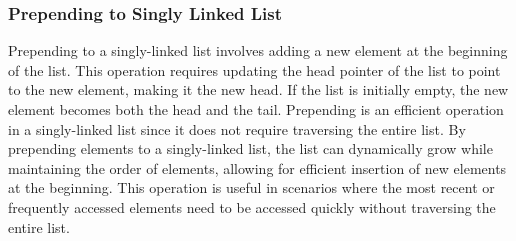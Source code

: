 \subsubsection{Prepending to Singly Linked List}

Prepending to a singly-linked list involves adding a new element at the beginning of the list. This operation requires updating the head pointer of the list to point to the new element, making it the new head. If the list is initially empty, the new element becomes both the head 
and the tail. Prepending is an efficient operation in a singly-linked list since it does not require traversing the entire list. By prepending elements to a singly-linked list, the list can dynamically grow while maintaining the order of elements, allowing for efficient insertion 
of new elements at the beginning. This operation is useful in scenarios where the most recent or frequently accessed elements need to be accessed quickly without traversing the entire list.

